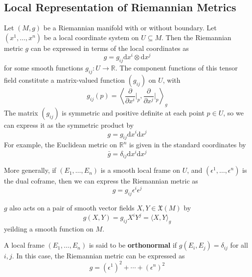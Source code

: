 \documentclass[../main.tex]{subfiles}
\begin{document}
\subsection{Local Representation of Riemannian Metrics}
Let $(M, g)$ be a Riemannian manifold with or without boundary. Let $(x^1, \ldots, x^n)$ be a local coordinate system on $U \subseteq M$. Then the Riemannian metric $g$ can be expressed in terms of the local coordinates as
\begin{equation}
	g = g_{ij} \mathrm{d}x^i \otimes \mathrm{d}x^j
\end{equation}
for some smooth functions $g_{ij}: U \to \mathbb{R}$. The component functions of this tensor field constitute a matrix-valued function $(g_{ij})$ on $U$, with
\begin{equation*}
	g_{ij}(p) = \left\langle \frac{\partial}{\partial x^i}\Big|_p, \frac{\partial}{\partial x^j}\Big|_p \right\rangle_g
\end{equation*}
The matrix $(g_{ij})$ is symmetric and positive definite at each point $p \in U$, so we can express it as the symmetric product by
\begin{equation*}
	g = g_{ij} \mathrm{d}x^i \mathrm{d}x^j
\end{equation*}
For example, the Euclidean metric on $\mathbb{R}^n$ is given in the standard coordinates by
\begin{equation*}
	\bar{g} = \delta_{ij} \mathrm{d}x^i \mathrm{d}x^j
\end{equation*}

More generally, if $(E_1, \ldots, E_n)$ is a smooth local frame on $U$, and $(\epsilon^1, \ldots, \epsilon^n)$ is the dual coframe, then we can express the Riemannian metric as
\begin{equation}
	g = g_{ij} \epsilon^i \epsilon^j
\end{equation}

$g$ also acts on a pair of smooth vector fields $X, Y \in \mathfrak{X}(M)$ by
\begin{equation}
	g(X, Y) = g_{ij} X^i Y^j = \langle X, Y \rangle_g
\end{equation}
yeilding a smooth function on $M$.

A local frame $(E_1, \ldots, E_n)$ is said to be \textbf{orthonormal} if $g(E_i, E_j) = \delta_{ij}$ for all $i, j$. In this case, the Riemannian metric can be expressed as
\begin{equation*}
	g = (\epsilon^1)^2 + \cdots + (\epsilon^n)^2
\end{equation*}
\end{document}
